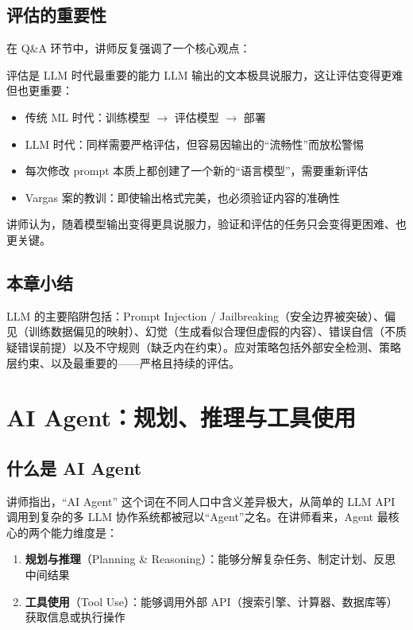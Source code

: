 \documentclass[a4paper]{article}
\begin{document}
\subsection{评估的重要性}

在 Q\&A 环节中，讲师反复强调了一个核心观点：

\begin{importantbox}{评估是 LLM 时代最重要的能力}
LLM 输出的文本极具说服力，这让评估变得更难但也更重要：
\begin{itemize}
    \item 传统 ML 时代：训练模型 $\rightarrow$ 评估模型 $\rightarrow$ 部署
    \item LLM 时代：同样需要严格评估，但容易因输出的``流畅性''而放松警惕
    \item 每次修改 prompt 本质上都创建了一个新的``语言模型''，需要重新评估
    \item Vargas 案的教训：即使输出格式完美，也必须验证内容的准确性
\end{itemize}
讲师认为，随着模型输出变得更具说服力，验证和评估的任务只会变得更困难、也更关键。
\end{importantbox}

\subsection{本章小结}

LLM 的主要陷阱包括：Prompt Injection / Jailbreaking（安全边界被突破）、偏见（训练数据偏见的映射）、幻觉（生成看似合理但虚假的内容）、错误自信（不质疑错误前提）以及不守规则（缺乏内在约束）。应对策略包括外部安全检测、策略层约束、以及最重要的——严格且持续的评估。

\section{AI Agent：规划、推理与工具使用}

\subsection{什么是 AI Agent}

讲师指出，``AI Agent'' 这个词在不同人口中含义差异极大，从简单的 LLM API 调用到复杂的多 LLM 协作系统都被冠以``Agent''之名。在讲师看来，Agent 最核心的两个能力维度是：

\begin{enumerate}
    \item \textbf{规划与推理}（Planning \& Reasoning）：能够分解复杂任务、制定计划、反思中间结果
    \item \textbf{工具使用}（Tool Use）：能够调用外部 API（搜索引擎、计算器、数据库等）获取信息或执行操作
\end{enumerate}
\end{document}

